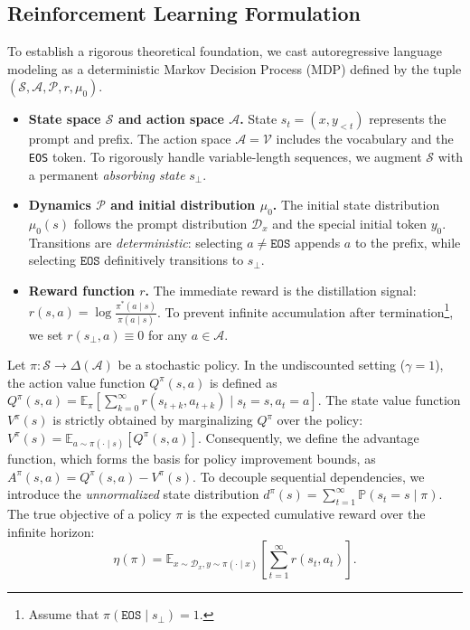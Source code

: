 \documentclass{article}
\theoremstyle{plain}
\theoremstyle{definition}
\theoremstyle{remark}
\begin{document}
\subsection{Reinforcement Learning Formulation}\label{Reinforcement Learning Formulation}
To establish a rigorous theoretical foundation, we cast autoregressive language modeling as a deterministic Markov Decision Process (MDP) defined by the tuple $\left(\mathcal{S},\mathcal{A},\mathcal{P},r,\mu_0\right)$.
\begin{itemize}
	\item \textbf{State space $\mathcal{S}$ and action space $\mathcal{A}$.} State $s_t = (x, y_{<t})$ represents the prompt and prefix. The action space $\mathcal{A} = \mathcal{V} $ includes the vocabulary and the \texttt{EOS} token. To rigorously handle variable-length sequences, we augment $\mathcal{S}$ with a permanent \textit{absorbing state} $s_\bot$.
	\item \textbf{Dynamics $\mathcal{P}$ and initial distribution $\mu_0$.} The initial state distribution $\mu_0(s)$ follows the prompt distribution $\mathcal{D}_x$ and the special initial token $y_0$. Transitions are \textit{deterministic}: selecting $a \neq \texttt{EOS}$ appends $a$ to the prefix, while selecting $\texttt{EOS}$ definitively transitions to $s_\bot$.
	\item \textbf{Reward function $r$.} The immediate reward is the distillation signal: $r(s, a) = \log \frac{\pi^*(a \mid s)}{\pi(a \mid s)}$. To prevent infinite accumulation after termination\footnote{Assume that $\pi(\texttt{EOS}\mid s_\bot)=1$.}, we set $r(s_\bot, a) \equiv 0$ for any $a\in\mathcal{A}$.
\end{itemize}

Let $\pi: \mathcal{S} \to \Delta(\mathcal{A})$ be a stochastic policy. In the undiscounted setting ($\gamma=1$), the action value function $Q^\pi(s, a)$ is defined as $Q^\pi(s, a) = \mathbb{E}_{\pi} \left[ \sum_{k=0}^{\infty} r(s_{t+k}, a_{t+k})\mid s_t=s, a_t=a \right]$. The state value function $V^\pi(s)$ is strictly obtained by marginalizing $Q^\pi$ over the policy: $V^\pi(s) = \mathbb{E}_{a \sim \pi(\cdot \mid s)} \left[ Q^\pi(s, a) \right]$. Consequently, we define the advantage function, which forms the basis for policy improvement bounds, as $A^\pi(s, a) = Q^\pi(s, a) - V^\pi(s)$. To decouple sequential dependencies, we introduce the \textit{unnormalized} state distribution $d^\pi(s) = \sum_{t=1}^{\infty}\mathbb{P}(s_t = s \mid \pi)$. The true objective of a policy $\pi$ is the expected cumulative reward over the infinite horizon:
\begin{equation}\label{original eta}
	\eta(\pi) = \mathbb{E}_{x \sim \mathcal{D}_x, y \sim \pi(\cdot \mid x)} \left[ \sum_{t=1}^{\infty} r(s_t, a_t) \right].
\end{equation}
\end{document}
